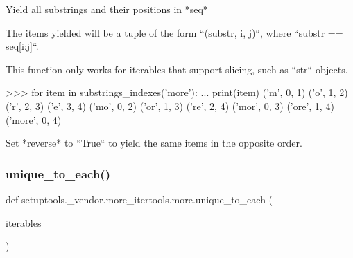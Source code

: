 \begin{DoxyVerb}Yield all substrings and their positions in *seq*

The items yielded will be a tuple of the form ``(substr, i, j)``, where
``substr == seq[i:j]``.

This function only works for iterables that support slicing, such as
``str`` objects.

>>> for item in substrings_indexes('more'):
...    print(item)
('m', 0, 1)
('o', 1, 2)
('r', 2, 3)
('e', 3, 4)
('mo', 0, 2)
('or', 1, 3)
('re', 2, 4)
('mor', 0, 3)
('ore', 1, 4)
('more', 0, 4)

Set *reverse* to ``True`` to yield the same items in the opposite order.\end{DoxyVerb}
 \mbox{\label{namespacesetuptools_1_1__vendor_1_1more__itertools_1_1more_a376635631242926b94a755c4fa316b14}} 
\subsubsection{\texorpdfstring{unique\+\_\+to\+\_\+each()}{unique\_to\_each()}}
{\footnotesize\ttfamily def setuptools.\+\_\+vendor.\+more\+\_\+itertools.\+more.\+unique\+\_\+to\+\_\+each (\begin{DoxyParamCaption}\item[{}]{iterables }\end{DoxyParamCaption})}

